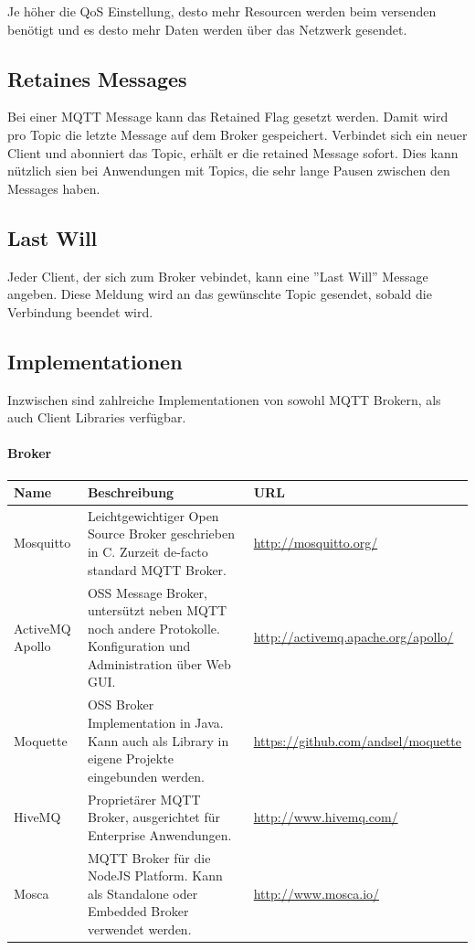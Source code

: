 Je höher die QoS Einstellung, desto mehr Resourcen werden beim versenden benötigt und es desto mehr Daten werden über das Netzwerk gesendet.

\subsection{Retaines Messages} \label{retained}
Bei einer MQTT Message kann das Retained Flag gesetzt werden. Damit wird pro Topic die letzte Message auf dem Broker gespeichert. Verbindet sich ein neuer Client und abonniert das Topic, erhält er die retained Message sofort. Dies kann nützlich sien bei Anwendungen mit Topics, die sehr lange Pausen zwischen den Messages haben.

\subsection{Last Will}
Jeder Client, der sich zum Broker vebindet, kann eine ''Last Will'' Message angeben. Diese Meldung wird an das gewünschte Topic gesendet, sobald die Verbindung beendet wird.

\pagebreak

\subsection{Implementationen}
Inzwischen sind zahlreiche Implementationen von sowohl MQTT Brokern, als auch Client Libraries verfügbar.

\paragraph{Broker}

\begin{center}
\begin{tabular}{ | m{5em} | m{25em}| m{12em} | }
 \hline \rowcolor{lightgray}
 Name & Beschreibung & URL \\
 \hline
 Mosquitto  & Leichtgewichtiger Open Source Broker geschrieben in C. Zurzeit de-facto standard MQTT Broker. & \url{http://mosquitto.org/}  \\
 \hline
 ActiveMQ Apollo   & OSS Message Broker, untersützt neben MQTT noch andere Protokolle. Konfiguration und Administration über Web GUI. & \url{http://activemq.apache.org/apollo/}  \\
  \hline
 Moquette  & OSS Broker Implementation in Java. Kann auch als Library in eigene Projekte eingebunden werden. & \url{https://github.com/andsel/moquette}  \\
 \hline
  HiveMQ  & Proprietärer MQTT Broker, ausgerichtet für Enterprise Anwendungen.  & \url{http://www.hivemq.com/}  \\
 \hline
  Mosca  & MQTT Broker für die NodeJS Platform. Kann als Standalone oder Embedded Broker verwendet werden.  & \url{http://www.mosca.io/}  \\
\hline

\end{tabular}
\end{center}



